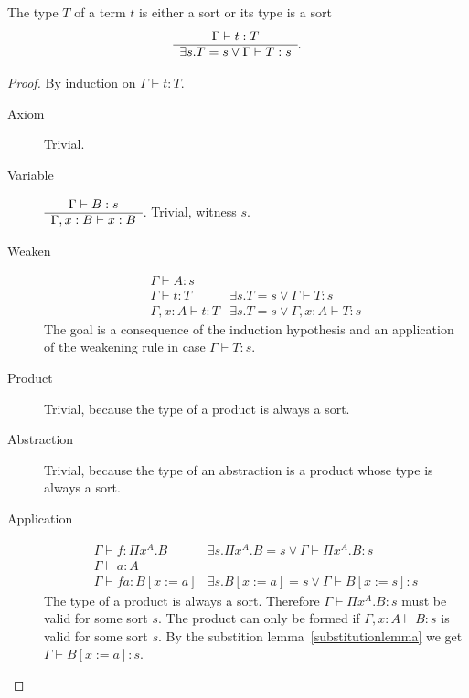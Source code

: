 \documentclass[12pt]{article}
\begin{document}
\begin{theorem} The type $T$ of a term $t$ is either a sort or its type is a
  sort
  $$
  \begin{array}{c} \Gamma \vdash t:T \\ \hline \exists s. T = s \lor \Gamma\vdash T:s\end{array}.
  $$

  \begin{proof}
    By induction on $\Gamma\vdash t:T$.
    \begin{description}

    \item[Axiom] Trivial.


    \item[Variable]
      $\begin{array}{c} \Gamma\vdash B:s \\ \hline \Gamma,x:B \vdash x:B\end{array}
      $. Trivial, witness $s$.

    \item[Weaken]
      $$
      \begin{array}{l|l}
        \Gamma \vdash A:s &
        \\
        \Gamma \vdash t:T & \exists s. T = s \lor \Gamma \vdash T:s
        \\
        \hline
        \Gamma,x:A \vdash t:T   & \exists s.
                                  T = s \lor \Gamma,x:A \vdash T:s
      \end{array}
      $$
      The goal is a consequence of the induction hypothesis and an
      application of the weakening rule in case $\Gamma\vdash T:s$.

    \item[Product] Trivial, because the type of a product is always a sort.

    \item[Abstraction] Trivial, because the type of an abstraction is a
      product whose type is always a sort.

    \item[Application]
      $$
      \begin{array}{l|l}
        \Gamma\vdash f:\Pi x^A.B & \exists s. \Pi x^A.B = s \lor
                                   \Gamma\vdash \Pi x^A.B: s
        \\
        \Gamma\vdash a:A
        \\
        \hline
        \Gamma\vdash f a:B[x:=a] & \exists s. B[x:=a] = s \lor
                                   \Gamma\vdash B[x:=s]: s
      \end{array}
      $$
      The type of a product is always a sort. Therefore
      $\Gamma\vdash \Pi x^A.B : s $ must be valid for some sort $s$. The
      product can only be formed if $\Gamma,x:A \vdash B:s$ is valid for some
      sort $s$. By the substition lemma~\ref{substitutionlemma} we get $\Gamma
      \vdash B[x:=a]: s$.


\end{description}
\end{proof}
\end{theorem}
\end{document}
